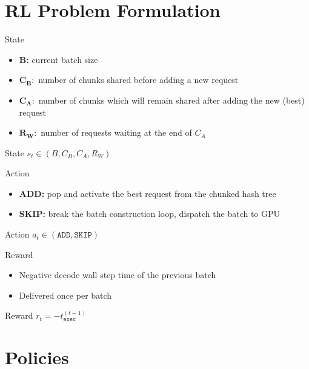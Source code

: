 \documentclass[Serif, 10pt, brown]{beamer}
\theoremstyle{example}
\theoremstyle{plain}
\begin{document}
\section{RL Problem Formulation}

\begin{frame}{State}
    \begin{itemize}
        \item \textbf{B:} current batch size
        \item $\mathbf{C_B:}$ number of chunks shared before adding a new request
        \item $\mathbf{C_A:}$ number of chunks which will remain shared after adding the new (best) request
        \item $\mathbf{R_W:}$ number of requests waiting at the end of $C_A$
    \end{itemize}
\begin{block}{State}
    $s_t \in (B, C_B, C_A, R_W)$
\end{block}
\end{frame}

\begin{frame}{Action}
    \begin{itemize}
        \item \textbf{ADD:} pop and activate the best request from the chunked hash tree
        \item \textbf{SKIP:} break the batch construction loop, dispatch the batch to GPU
    \end{itemize}
\begin{block}{Action}
    $a_t \in (\texttt{ADD}, \texttt{SKIP})$
\end{block}
\end{frame}

\begin{frame}{Reward}
    \begin{itemize}
        \item Negative decode wall step time of the previous batch
        \item Delivered once per batch
    \end{itemize}
    \begin{block}{Reward}
    $r_t = -t_{\texttt{exec}}^{(t-1)}$
\end{block}
\end{frame}

\section{Policies}
\end{document}
